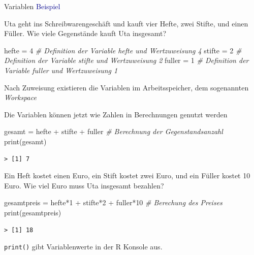 \documentclass[
  8pt,
  ignorenonframetext,
]{beamer}
\newenvironment{Shaded}{\begin{snugshade}}{\end{snugshade}}
\newcommand{\CommentTok}[1]{\textcolor[rgb]{0.56,0.35,0.01}{\textit{#1}}}
\newcommand{\DecValTok}[1]{\textcolor[rgb]{0.00,0.00,0.81}{#1}}
\newcommand{\FunctionTok}[1]{\textcolor[rgb]{0.00,0.00,0.00}{#1}}
\newcommand{\NormalTok}[1]{#1}
\newcommand{\OtherTok}[1]{\textcolor[rgb]{0.56,0.35,0.01}{#1}}
\newcommand{\SpecialCharTok}[1]{\textcolor[rgb]{0.00,0.00,0.00}{#1}}
\begin{document}
\begin{frame}[fragile]{Variablen}
\protect\hypertarget{variablen-2}{}
\textcolor{darkblue}{Beispiel} \vspace{2mm}

\footnotesize
\justifying

Uta geht ins Schreibwarengeschäft und kauft vier Hefte, zwei Stifte, und
einen Füller. Wie viele Gegenstände kauft Uta insgesamt?

\begin{Shaded}
\begin{Highlighting}[]
\NormalTok{hefte  }\OtherTok{=} \DecValTok{4}      \CommentTok{\# Definition der Variable \textquotesingle{}hefte\textquotesingle{}  und Wertzuweisung 4}
\NormalTok{stifte }\OtherTok{=} \DecValTok{2}      \CommentTok{\# Definition der Variable \textquotesingle{}stifte\textquotesingle{} und Wertzuweisung 2}
\NormalTok{fuller }\OtherTok{=} \DecValTok{1}      \CommentTok{\# Definition der Variable \textquotesingle{}fuller\textquotesingle{} und Wertzuweisung 1}
\end{Highlighting}
\end{Shaded}

Nach Zuweisung existieren die Variablen im Arbeitsspeicher, dem
sogenannten \textit{Workspace}

Die Variablen können jetzt wie Zahlen in Berechnungen genutzt werden

\begin{Shaded}
\begin{Highlighting}[]
\NormalTok{gesamt  }\OtherTok{=}\NormalTok{ hefte }\SpecialCharTok{+}\NormalTok{ stifte }\SpecialCharTok{+}\NormalTok{ fuller                    }\CommentTok{\# Berechnung der Gegenstandsanzahl}
\FunctionTok{print}\NormalTok{(gesamt)}
\end{Highlighting}
\end{Shaded}

\begin{verbatim}
> [1] 7
\end{verbatim}

Ein Heft kostet einen Euro, ein Stift kostet zwei Euro, und ein Füller
kostet 10 Euro. Wie viel Euro muss Uta insgesamt bezahlen?

\begin{Shaded}
\begin{Highlighting}[]
\NormalTok{gesamtpreis }\OtherTok{=}\NormalTok{ hefte}\SpecialCharTok{*}\DecValTok{1} \SpecialCharTok{+}\NormalTok{ stifte}\SpecialCharTok{*}\DecValTok{2} \SpecialCharTok{+}\NormalTok{ fuller}\SpecialCharTok{*}\DecValTok{10}         \CommentTok{\# Berechung des Preises}
\FunctionTok{print}\NormalTok{(gesamtpreis)}
\end{Highlighting}
\end{Shaded}

\begin{verbatim}
> [1] 18
\end{verbatim}

\texttt{print()} gibt Variablenwerte in der R Konsole aus.
\end{frame}
\end{document}
